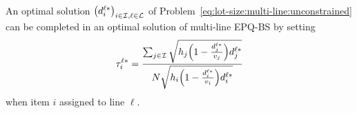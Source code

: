\begin{prop}\label{thm:lot-size:multi-line:unconstrained:optimality}
An optimal solution $\bracket{\demand_i^{\ell*}}_{i\in\REF,\ell\in\lines}$ of Problem~\eqref{eq:lot-size:multi-line:unconstrained} can be completed in an optimal solution of multi-line EPQ-BS by setting
\begin{equation}\label{eq:lot-size:multi-line:unconstrained:optimal-cover}
  \cover_i^{\ell*}= \frac{\sum_{j\in\REF}\sqrt{\holding_j\bracket{1-\frac{\demand_j^{\ell*}}{\rate_j}}\demand_j^{\ell*}}}{\nbsetups\sqrt{\holding_i\bracket{1-\frac{\demand_i^{\ell*}}{\rate_i}}\demand_i^{\ell*}}}
\end{equation}
when item $i$ assigned to line $\ell$.
\end{prop}










